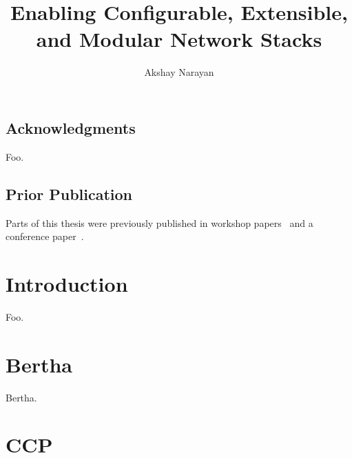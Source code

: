 \documentclass[fontsize=12pt,paper=letter,twosided,cleardoublepage=plain,final]{scrbook}
\title{Enabling Configurable, Extensible, and Modular Network Stacks}
\author{Akshay Narayan}
\begin{document}
\frontmatter



\cleardoublepage


\cleardoublepage

\section*{Acknowledgments}
\begin{spacing}{1}
%
    Foo.
\end{spacing}
\cleardoublepage

\section*{Prior Publication}
Parts of this thesis were previously published in workshop papers~\cite{ccp, bertha} and a conference
paper~\cite{ccp}.
\cleardoublepage

\tableofcontents

\mainmatter

\chapter{Introduction}\label{s:intro}

Foo.

%
%
\chapter{Bertha}\label{s:bertha}

Bertha.
%

\chapter{CCP}\label{s:ccp}










%
%
%
%
%
%
%

\backmatter

\begin{spacing}{1}
    

\end{spacing}
\end{document}
